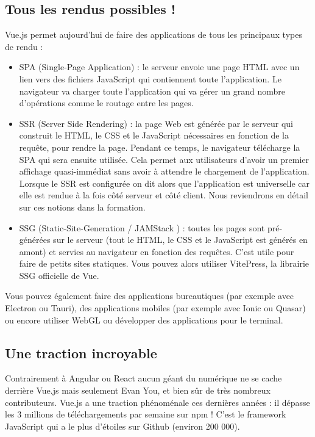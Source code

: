 \subsection{Tous les rendus possibles !}
{\color{monOrange}Vue.js} permet aujourd'hui de faire des applications de tous les principaux types de rendu :
\begin{itemize}
\item {\color{monOrange}SPA} (Single-Page Application) : le serveur envoie une page {\color{monOrange}HTML} avec un lien vers des fichiers {\color{monOrange}JavaScript} qui contiennent toute l'application. Le navigateur va charger toute l'application qui va gérer un grand nombre d'opérations comme le routage entre les pages.

\item {\color{monOrange}SSR} (Server Side Rendering) : la page {\color{monOrange}Web} est générée par le serveur qui construit le {\color{monOrange}HTML}, le {\color{monOrange}CSS} et le {\color{monOrange}JavaScript} nécessaires en fonction de la requête, pour rendre la page. Pendant ce temps, le navigateur télécharge la {\color{monOrange}SPA} qui sera ensuite utilisée. Cela permet aux utilisateurs d'avoir un premier affichage quasi-immédiat sans avoir à attendre le chargement de l'application. Lorsque le {\color{monOrange}SSR} est configurée on dit alors que l'application est universelle car elle est rendue à la fois côté serveur et côté client. Nous reviendrons en détail sur ces notions dans la formation.

\item {\color{monOrange}SSG} (Static-Site-Generation / JAMStack ) : toutes les pages sont pré-générées sur le serveur (tout le {\color{monOrange}HTML}, le {\color{monOrange}CSS} et le {\color{monOrange}JavaScript} est générés en amont) et servies au navigateur en fonction des requêtes. C'est utile pour faire de petits sites statiques. Vous pouvez alors utiliser {\color{monOrange}VitePress}, la librairie {\color{monOrange}SSG} officielle de {\color{monOrange}Vue}.

\end{itemize}
Vous pouvez également faire des applications bureautiques (par exemple avec {\color{monOrange}Electron} ou {\color{monOrange}Tauri}), des applications mobiles (par exemple avec {\color{monOrange}Ionic} ou {\color{monOrange}Quasar}) ou encore utiliser {\color{monOrange}WebGL} ou développer des applications pour le terminal.

\subsection{Une traction incroyable}
Contrairement à {\color{monOrange}Angular} ou {\color{monOrange}React} aucun géant du numérique ne se cache derrière {\color{monOrange}Vue.js} mais seulement {\color{monOrange}Evan You}, et bien sûr de très nombreux contributeurs. {\color{monOrange}Vue.js} a une traction phénoménale ces dernières années : il dépasse les 3 millions de téléchargements par semaine sur {\color{monOrange}npm} ! C'est le framework {\color{monOrange}JavaScript} qui a le plus d'étoiles sur {\color{monOrange}Github} (environ 200 000).


